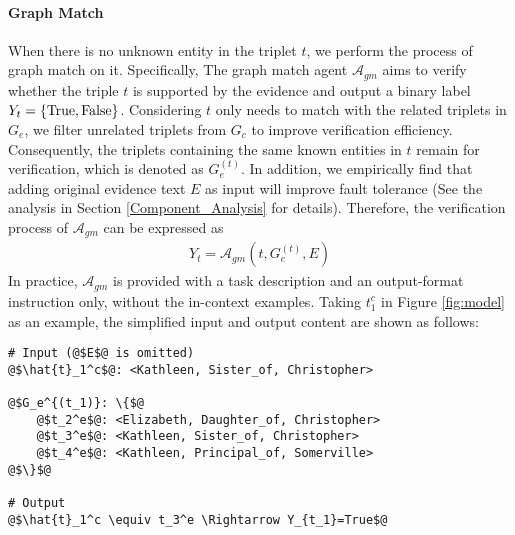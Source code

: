 \paragraph{Graph Match}\label{sec:Graph Match} When there is no unknown entity in the triplet $t$, we perform the process of graph match on it. Specifically, The graph match agent $\mathcal{A}_{gm}$ aims to verify whether the triple $t$ is supported by the evidence and output a binary label $Y_t=\{{\rm True}, {\rm False}\}$. Considering $t$ only needs to match with the related triplets in $G_e$, we filter unrelated triplets from $G_c$ to improve verification efficiency. Consequently, the triplets containing the same known entities in $t$ remain for verification, which is denoted as $G^{(t)}_e$. In addition, we empirically find that adding original evidence text $E$ as input will improve fault tolerance (See the analysis in Section \ref{Component_Analysis} for details). Therefore, the verification process of $\mathcal{A}_{gm}$ can be expressed as
\begin{align}
    Y_{t} = \mathcal{A}_{gm}(t, G^{(t)}_e, E)
\end{align}
In practice, $\mathcal{A}_{gm}$ is provided with a task description and an output-format instruction only, without the in-context examples. Taking $t^c_1$ in Figure \ref{fig:model} as an example, the simplified input and output content  are shown as follows:
\begin{lstlisting}[style=myStyle*]
# Input (@$E$@ is omitted)
@$\hat{t}_1^c$@: <Kathleen, Sister_of, Christopher>

@$G_e^{(t_1)}: \{$@
    @$t_2^e$@: <Elizabeth, Daughter_of, Christopher>
    @$t_3^e$@: <Kathleen, Sister_of, Christopher>
    @$t_4^e$@: <Kathleen, Principal_of, Somerville>
@$\}$@

# Output
@$\hat{t}_1^c \equiv t_3^e \Rightarrow Y_{t_1}=True$@ 
\end{lstlisting}

